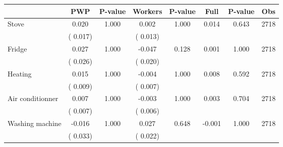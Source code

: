 
\begin{tabular}{l*{7}{c}}\hline&\multicolumn{1}{c}{PWP}&\multicolumn{1}{c}{P-value}&\multicolumn{1}{c}{Workers}&\multicolumn{1}{c}{P-value}&\multicolumn{1}{c}{Full}&\multicolumn{1}{c}{P-value}&\multicolumn{1}{c}{Obs} \\ \hline

 Stove       &              0.020       &        1.000  &              0.002       &        1.000  &              0.014       &              0.643 &  2718 \\ 
                       &       (       0.017)             &                               &       (       0.013)                     &                               &                                               &                                &                      \\ 

 Fridge       &              0.027       &        1.000  &             -0.047       &        0.128  &              0.001       &              1.000 &  2718 \\ 
                       &       (       0.026)             &                               &       (       0.020)                     &                               &                                               &                                &                      \\ 

 Heating       &              0.015       &        1.000  &             -0.004       &        1.000  &              0.008       &              0.592 &  2718 \\ 
                       &       (       0.009)             &                               &       (       0.007)                     &                               &                                               &                                &                      \\ 

 Air conditionner       &              0.007       &        1.000  &             -0.003       &        1.000  &              0.003       &              0.704 &  2718 \\ 
                       &       (       0.007)             &                               &       (       0.006)                     &                               &                                               &                                &                      \\ 

 Washing machine       &             -0.016       &        1.000  &              0.027       &        0.648  &             -0.001       &              1.000 &  2718 \\ 
                       &       (       0.033)             &                               &       (       0.022)                     &                               &                                               &                                &                      \\ 


\end{tabular}
